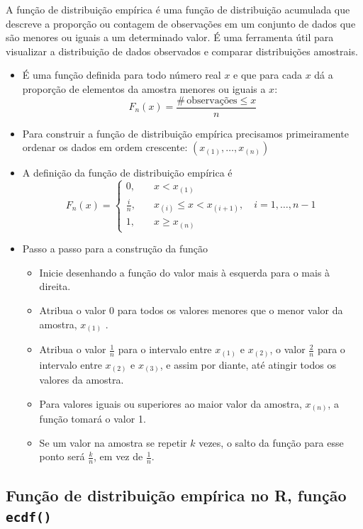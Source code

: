 \documentclass[
]{book}
\providecommand{\tightlist}{%
  \setlength{\itemsep}{0pt}\setlength{\parskip}{0pt}}
\begin{document}
A função de distribuição empírica é uma função de distribuição acumulada que descreve a proporção ou contagem de observações em um conjunto de dados que são menores ou iguais a um determinado valor. É uma ferramenta útil para visualizar a distribuição de dados observados e comparar distribuições amostrais.

\begin{itemize}
\item
  É uma função definida para todo número real \(x\) e que para cada \(x\) dá a proporção de elementos da amostra menores ou iguais a \(x\):
  \[F_{n}(x) = \frac{\# \, \text{observações} \leq x}{n}\]
\item
  Para construir a função de distribuição empírica precisamos primeiramente ordenar os dados em ordem crescente: \((x_{(1)},\ldots,x_{(n)})\)
\item
  A definição da função de distribuição empírica é
  \[F_{n}(x) = \begin{cases}
    0, & \quad x < x_{(1)} \\
    \frac{i}{n}, & \quad x_{(i)}\leq x < x_{(i+1)}, \quad i=1,\ldots,n-1 \\
    1, & \quad x\geq x_{(n)}
  \end{cases}\]
\item
  Passo a passo para a construção da função

  \begin{itemize}
  \tightlist
  \item
    Inicie desenhando a função do valor mais à esquerda para o mais à direita.
  \item
    Atribua o valor 0 para todos os valores menores que o menor valor da amostra, \(x_{(1)}\) .
  \item
    Atribua o valor \(\frac{1}{n}\) para o intervalo entre \(x_{(1)}\) e \(x_{(2)}\), o valor \(\frac{2}{n}\) para o intervalo entre \(x_{(2)}\) e \(x_{(3)}\), e assim por diante, até atingir todos os valores da amostra.
  \item
    Para valores iguais ou superiores ao maior valor da amostra, \(x_{(n)}\), a função tomará o valor 1.
  \item
    Se um valor na amostra se repetir \(k\) vezes, o salto da função para esse ponto será \(\frac{k}{n}\), em vez de \(\frac{1}{n}\).
  \end{itemize}
\end{itemize}

\subsection{\texorpdfstring{Função de distribuição empírica no R, função \texttt{ecdf()}}{Função de distribuição empírica no R, função ecdf()}}\label{funuxe7uxe3o-de-distribuiuxe7uxe3o-empuxedrica-no-r-funuxe7uxe3o-ecdf}
\end{document}
